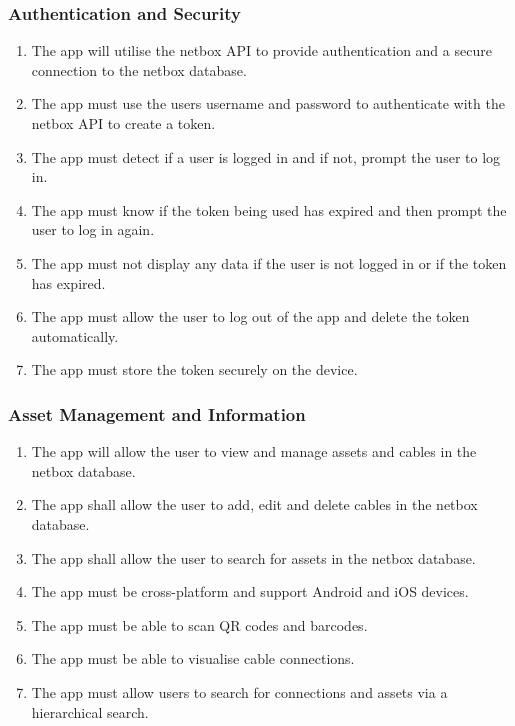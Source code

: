 \documentclass [11pt,a4paper]{article}
\begin{document}
\subsubsection{Authentication and Security}
\label{sec:spec_auth}
\begin{enumerate}[label={\fbox{AUTH\_SPEC\_\arabic*}}, leftmargin=*, labelindent=\parindent]
    \item The app will utilise the netbox API to provide authentication and a secure connection to the netbox database.  \label{spec_auth_1}
    \item The app must use the users username and password to authenticate with the netbox API to create a token. \label{spec_auth_2}
    \item The app must detect if a user is logged in and if not, prompt the user to log in. \label{spec_auth_3}
    \item The app must know if the token being used has expired and then prompt the user to log in again. \label{spec_auth_4}
    \item The app must not display any data if the user is not logged in or if the token has expired. \label{spec_auth_5}
    \item The app must allow the user to log out of the app and delete the token automatically. \label{spec_auth_6}
    \item The app must store the token securely on the device. \label{spec_auth_7}
\end{enumerate}

\subsubsection{Asset Management and Information}
\label{sec:spec_asset}
\begin{enumerate}[label={\fbox{ASST\_SPEC\_\arabic*}}, leftmargin=*, labelindent=\parindent]
    \item The app will allow the user to view and manage assets and cables in the netbox database. \label{spec_asset_1}
    \item The app shall allow the user to add, edit and delete cables in the netbox database. \label{spec_asset_2}
    \item The app shall allow the user to search for assets in the netbox database. \label{spec_asset_3}
    \item The app must be cross-platform and support Android and iOS devices. \label{spec_asset_4}
    \item The app must be able to scan QR codes and barcodes.  \label{spec_asset_5}
    \item The app must be able to visualise cable connections. \label{spec_asset_6}
    \item The app must allow users to search for connections and assets via a hierarchical search. \label{spec_asset_7}
\end{enumerate}
\end{document}

